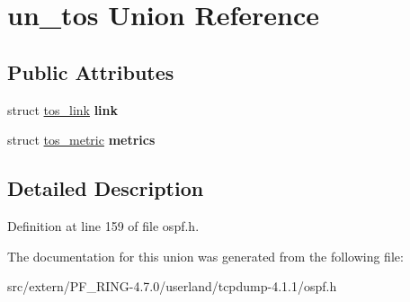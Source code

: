 \hypertarget{unionun__tos}{
\section{un\_\-tos Union Reference}
\label{unionun__tos}
}
\subsection*{Public Attributes}
\begin{DoxyCompactItemize}
\item 
\hypertarget{unionun__tos_ab67275bb552df9720fa55e97c5ba4d72}{
struct \hyperlink{structtos__link}{tos\_\-link} {\bfseries link}}
\label{unionun__tos_ab67275bb552df9720fa55e97c5ba4d72}

\item 
\hypertarget{unionun__tos_a1ad3f2f5f5f229d5ff6629dc4019b443}{
struct \hyperlink{structtos__metric}{tos\_\-metric} {\bfseries metrics}}
\label{unionun__tos_a1ad3f2f5f5f229d5ff6629dc4019b443}

\end{DoxyCompactItemize}


\subsection{Detailed Description}


Definition at line 159 of file ospf.h.



The documentation for this union was generated from the following file:\begin{DoxyCompactItemize}
\item 
src/extern/PF\_\-RING-\/4.7.0/userland/tcpdump-\/4.1.1/ospf.h\end{DoxyCompactItemize}
